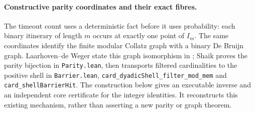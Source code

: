 \paragraph{Constructive parity coordinates and their exact fibres.}
The timeout count uses a deterministic fact before it uses probability:
each binary itinerary of length \(m\) occurs at exactly one point of
\(I_m\). The same coordinates identify the finite modular Collatz graph
with a binary De Bruijn graph. Laarhoven--de Weger state this graph
isomorphism in \cite[Section~2]{LaarhovenDeWeger2012}; Shaik proves the
parity bijection in \texttt{Parity.lean}, then transports filtered
cardinalities to the positive shell in
\texttt{Barrier.lean}, \texttt{card\_dyadicShell\_filter\_mod\_mem} and
\texttt{card\_shellBarrierHit}. The construction below gives an executable
inverse and an independent core certificate for the integer identities.
It reconstructs this existing mechanism, rather than asserting a new
parity or graph theorem.

